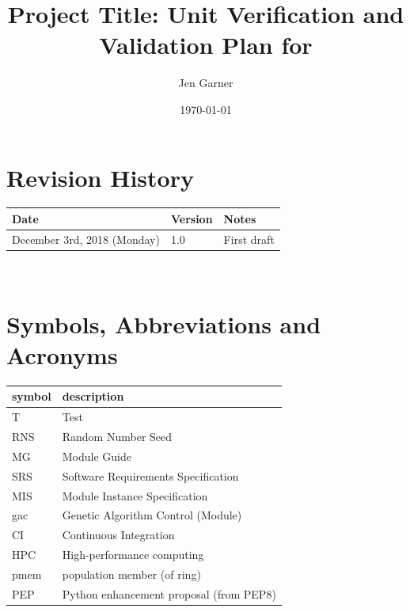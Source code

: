 \documentclass[12pt, titlepage]{article}
\begin{document}
\title{Project Title: Unit Verification and Validation Plan for \progname{}} 
\author{Jen  Garner}
\date{\today}
	
\maketitle


\section{Revision History}

\begin{tabularx}{\textwidth}{p{3cm}p{2cm}X}
\toprule {\bf Date} & {\bf Version} & {\bf Notes}\\
\midrule
December 3rd, 2018 (Monday) & 1.0 & First draft \\
\bottomrule
\end{tabularx}

~\newpage

\tableofcontents


\listoffigures

\newpage

\section{Symbols, Abbreviations and Acronyms}

\renewcommand{\arraystretch}{1.2}
\begin{tabular}{l l} 
  \toprule		
  \textbf{symbol} & \textbf{description}\\
  \midrule 
  T & Test \\
  RNS & Random Number Seed \\
  MG & Module Guide \\
  SRS & Software Requirements Specification \\
  MIS & Module Instance Specification \\
  gac & Genetic Algorithm Control (Module) \\
  CI & Continuous Integration \\
  HPC & High-performance computing \\
  pmem & population member (of ring) \\
  PEP & Python enhancement proposal (from PEP8) \\
  \bottomrule
\end{tabular}\\
\end{document}
